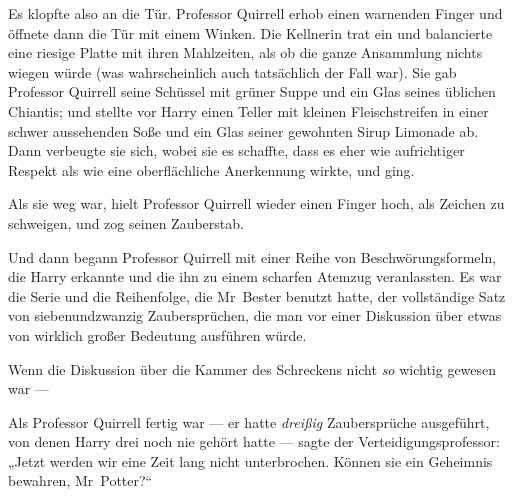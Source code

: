 Es klopfte also an die Tür. Professor Quirrell erhob einen warnenden Finger und öffnete dann die Tür mit einem Winken. Die Kellnerin trat ein und balancierte eine riesige Platte mit ihren Mahlzeiten, als ob die ganze Ansammlung nichts wiegen würde (was wahrscheinlich auch tatsächlich der Fall war). Sie gab Professor Quirrell seine Schüssel mit grüner Suppe und ein Glas seines üblichen Chiantis; und stellte vor Harry einen Teller mit kleinen Fleischstreifen in einer schwer aussehenden Soße und ein Glas seiner gewohnten Sirup Limonade ab. Dann verbeugte sie sich, wobei sie es schaffte, dass es eher wie aufrichtiger Respekt als wie eine oberflächliche Anerkennung wirkte, und ging.

Als sie weg war, hielt Professor Quirrell wieder einen Finger hoch, als Zeichen zu schweigen, und zog seinen Zauberstab.

Und dann begann Professor Quirrell mit einer Reihe von Beschwörungsformeln, die Harry erkannte und die ihn zu einem scharfen Atemzug veranlassten. Es war die Serie und die Reihenfolge, die Mr~Bester benutzt hatte, der vollständige Satz von siebenundzwanzig Zaubersprüchen, die man vor einer Diskussion über etwas von wirklich großer Bedeutung ausführen würde.

Wenn die Diskussion über die Kammer des Schreckens nicht \emph{so} wichtig gewesen war —

Als Professor Quirrell fertig war — er hatte \emph{dreißig} Zaubersprüche ausgeführt, von denen Harry drei noch nie gehört hatte — sagte der Verteidigungsprofessor:
„Jetzt werden wir eine Zeit lang nicht unterbrochen. Können sie ein Geheimnis bewahren, Mr~Potter?“

